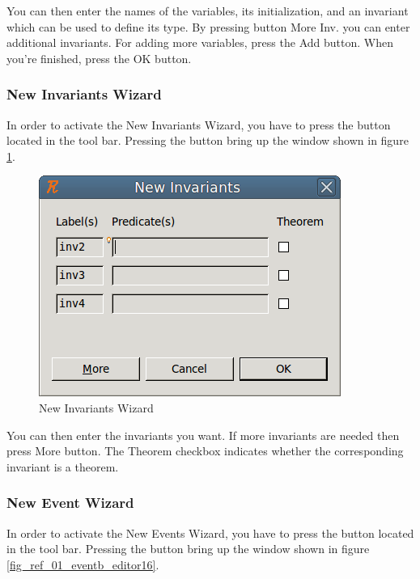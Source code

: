 You can then enter the names of the variables, its initialization, and an invariant which can be used to define its type. By pressing button \textsf{More Inv.} you can enter additional invariants. For adding more variables, press the \textsf{Add} button. When you’re finished, press the \textsf{OK} button. 

\subsubsection{New Invariants Wizard}

In order to activate the \textsf{New Invariants Wizard}, you have to press the  button located in the tool bar. Pressing the button bring up the window shown in figure \ref{fig_ref_01_eventb_editor15}.

\begin{figure}[!h]
\begin{center}
	\includegraphics{img/reference/ref_01_eventb_editor15.png}
	\caption{New Invariants Wizard}
	\label{fig_ref_01_eventb_editor15}
\end{center}
\end{figure}

You can then enter the invariants you want. If more invariants are needed then press \textsf{More} button. The \textsf{Theorem} checkbox indicates whether the corresponding invariant is a theorem.

\subsubsection{New Event Wizard}

In order to activate the \textsf{New Events Wizard}, you have to press the  button located in the tool bar. Pressing the button bring up the window shown in figure \ref{fig_ref_01_eventb_editor16}.

